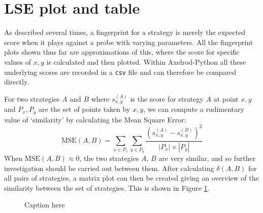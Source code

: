 \section{LSE plot and table}\label{sec:lse}
As described several times, a fingerprint for a strategy is merely the expected score when it plays against a probe with varying parameters.
All the fingerprint plots shown thus far are approximations of this, where the score for specific values of $x, y$ is calculated and then plotted.
Within Axelrod-Python all these underlying scores are recorded in a \texttt{csv} file and can therefore be compared directly.

For two strategies $A$ and $B$ where $s_{x, y}^{(A)}$ is the score for strategy $A$ at point $x, y$ and $P_x, P_y$ are the set of points taken by $x, y$, we can compute a rudimentary value of `similarity' by calculating the Mean Square Error:
$$
\text{MSE}(A, B) = \sum_{x \in P_x} \sum_{y \in P_y} \frac{(s_{x, y}^{(A)} - s_{x, y}^{(B)})^2}{|P_x|\times|P_y|}
$$
When $\text{MSE}(A, B) \approx 0$, the two strategies $A$, $B$ are very similar, and so further investigation should be carried out between them.
After calculating $\delta(A, B)$ for all pairs of strategies, a matrix plot can then be created giving an overview of the similarity between the set of strategies.
This is shown in Figure \ref{fig:mean_squares}.

\begin{figure}[htbp!]
    \caption{Caption here}
    \label{fig:mean_squares}
\end{figure}
